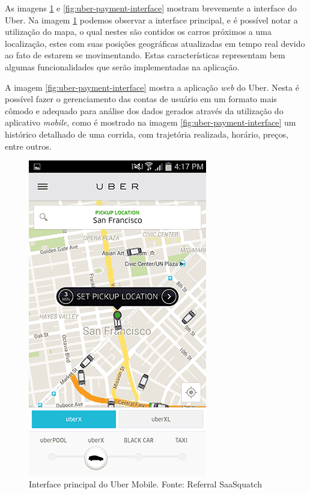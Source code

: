 As imagens \ref{fig:uber-main-interface} e \ref{fig:uber-payment-interface} mostram brevemente a interface do Uber. Na imagem \ref{fig:uber-main-interface} podemos observar a interface principal, e é possível notar a utilização do mapa, o qual nestes são contidos os carros próximos a uma localização, estes com suas posições geográficas atualizadas em tempo real devido ao fato de estarem se movimentando. Estas características representam bem algumas funcionalidades que serão implementadas na aplicação.

A imagem \ref{fig:uber-payment-interface} mostra a aplicação \textit{web} do Uber. Nesta é possível fazer o gerenciamento das contas de usuário em um formato mais cômodo e adequado para análise dos dados gerados através da utilização do aplicativo \textit{mobile}, como é mostrado na imagem \ref{fig:uber-payment-interface} um histórico detalhado de uma corrida, com trajetória realizada, horário, preços, entre outros.

\begin{figure}[H]
	\centering
	\includegraphics[scale=0.6]{imagens/uber.png}
	\caption{\small Interface principal do Uber Mobile. Fonte: Referral SaaSquatch \cite{uber-imgs}}
	\label{fig:uber-main-interface}
\end{figure}

